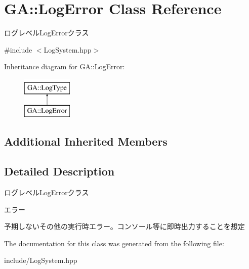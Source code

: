\hypertarget{class_g_a_1_1_log_error}{}\section{GA\+::Log\+Error Class Reference}
\label{class_g_a_1_1_log_error}


ログレベル\+Log\+Errorクラス  




{\ttfamily \#include $<$Log\+System.\+hpp$>$}

Inheritance diagram for GA\+::Log\+Error\+:\begin{figure}[H]
\begin{center}
\leavevmode
\includegraphics[height=2.000000cm]{class_g_a_1_1_log_error}
\end{center}
\end{figure}
\subsection*{Additional Inherited Members}


\subsection{Detailed Description}
ログレベル\+Log\+Errorクラス 

エラー

予期しないその他の実行時エラー。コンソール等に即時出力することを想定 

The documentation for this class was generated from the following file\+:\begin{DoxyCompactItemize}
\item 
include/Log\+System.\+hpp\end{DoxyCompactItemize}
